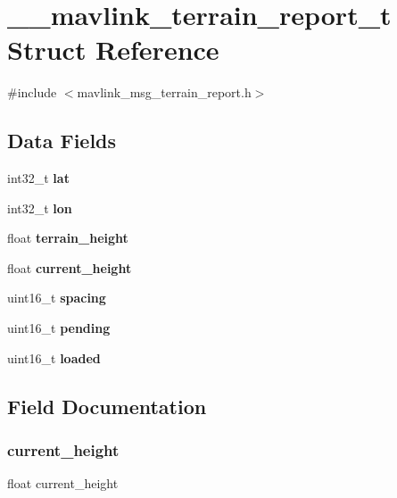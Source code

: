\section{\+\_\+\+\_\+mavlink\+\_\+terrain\+\_\+report\+\_\+t Struct Reference}
\label{struct____mavlink__terrain__report__t}


{\ttfamily \#include $<$mavlink\+\_\+msg\+\_\+terrain\+\_\+report.\+h$>$}

\subsection*{Data Fields}
\begin{DoxyCompactItemize}
\item 
int32\+\_\+t \textbf{ lat}
\item 
int32\+\_\+t \textbf{ lon}
\item 
float \textbf{ terrain\+\_\+height}
\item 
float \textbf{ current\+\_\+height}
\item 
uint16\+\_\+t \textbf{ spacing}
\item 
uint16\+\_\+t \textbf{ pending}
\item 
uint16\+\_\+t \textbf{ loaded}
\end{DoxyCompactItemize}


\subsection{Field Documentation}
\mbox{\label{struct____mavlink__terrain__report__t_a9ad61fa0764ecfedcdbfd560565a48ba}} 
\subsubsection{current\+\_\+height}
{\footnotesize\ttfamily float current\+\_\+height}

\mbox{\label{struct____mavlink__terrain__report__t_a58d1cfb46a8035aadcb0d2b3f178e1ed}} 
